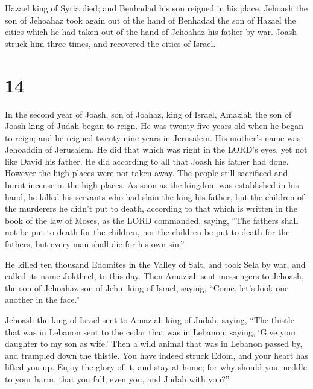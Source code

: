  Hazael king of Syria died; and Benhadad his son reigned
in his place.  Jehoash the son of Jehoahaz took again out
of the hand of Benhadad the son of Hazael the cities which he had taken
out of the hand of Jehoahaz his father by war. Joash struck him three
times, and recovered the cities of Israel.

\hypertarget{section-13}{%
\section{14}\label{section-13}}

 In the second year of Joash, son of Joahaz, king of
Israel, Amaziah the son of Joash king of Judah began to reign.
 He was twenty-five years old when he began to reign; and
he reigned twenty-nine years in Jerusalem. His mother's name was
Jehoaddin of Jerusalem.  He did that which was right in
the LORD's eyes, yet not like David his father. He did according to all
that Joash his father had done.  However the high places
were not taken away. The people still sacrificed and burnt incense in
the high places.  As soon as the kingdom was established
in his hand, he killed his servants who had slain the king his father,
 but the children of the murderers he didn't put to death,
according to that which is written in the book of the law of Moses, as
the LORD commanded, saying, ``The fathers shall not be put to death for
the children, nor the children be put to death for the fathers; but
every man shall die for his own sin.''

 He killed ten thousand Edomites in the Valley of Salt,
and took Sela by war, and called its name Joktheel, to this day.
 Then Amaziah sent messengers to Jehoash, the son of
Jehoahaz son of Jehu, king of Israel, saying, ``Come, let's look one
another in the face.''

 Jehoash the king of Israel sent to Amaziah king of Judah,
saying, ``The thistle that was in Lebanon sent to the cedar that was in
Lebanon, saying, `Give your daughter to my son as wife.' Then a wild
animal that was in Lebanon passed by, and trampled down the thistle.
 You have indeed struck Edom, and your heart has lifted
you up. Enjoy the glory of it, and stay at home; for why should you
meddle to your harm, that you fall, even you, and Judah with you?''

